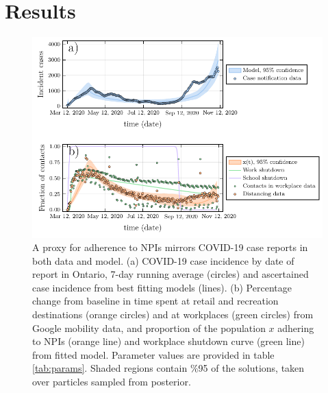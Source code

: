\section{Results} 

\begin{figure}
\includegraphics[width=\textwidth]{chapter_1/plot_model.pdf} 
\caption[A proxy for adherence to NPIs mirrors COVID-19 case reports in both data and model.]{A proxy for adherence to NPIs mirrors COVID-19 case reports in both data and model. (a) COVID-19 case incidence by date of report in Ontario, 7-day running average (circles) and ascertained case incidence from best fitting models (lines). (b) Percentage change from baseline in time spent at retail and recreation destinations (orange circles) and at workplaces (green circles) from Google mobility data, and proportion of the population $x$ adhering to NPIs (orange line) and workplace shutdown curve (green line) from fitted model.  Parameter values are provided in table \ref{tab:params}. Shaded regions contain \%95 of the solutions, taken over particles sampled from posterior. }
\label{fig1}
\end{figure}

